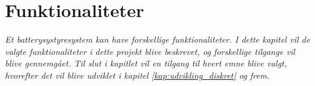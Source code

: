 \chapter{Funktionaliteter}\label{kap:funktionaliteter}

\emph{Et batterysystyresystem kan have forskellige funktionaliteter. I dette kapitel vil de valgte funktionaliteter i dette projekt blive beskrevet, og forskellige tilgange vil blive gennemgået. Til slut i kapitlet vil en tilgang til hvert emne blive valgt, hvorefter det vil blive udviklet i kapitel \ref{kap:udvikling_diskret} og frem.}


